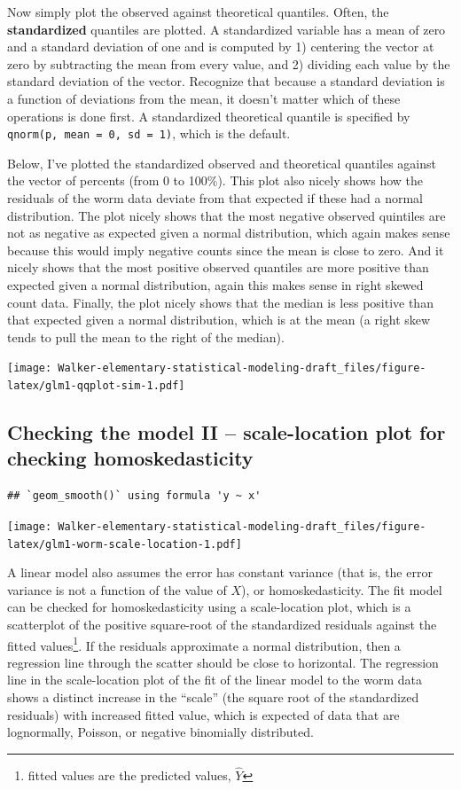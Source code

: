 \documentclass[]{book}
\let\rmarkdownfootnote\footnote%
\def\footnote{\protect\rmarkdownfootnote}
\begin{document}
Now simply plot the observed against theoretical quantiles. Often, the \textbf{standardized} quantiles are plotted. A standardized variable has a mean of zero and a standard deviation of one and is computed by 1) centering the vector at zero by subtracting the mean from every value, and 2) dividing each value by the standard deviation of the vector. Recognize that because a standard deviation is a function of deviations from the mean, it doesn't matter which of these operations is done first. A standardized theoretical quantile is specified by \texttt{qnorm(p,\ mean\ =\ 0,\ sd\ =\ 1)}, which is the default.

Below, I've plotted the standardized observed and theoretical quantiles against the vector of percents (from 0 to 100\%). This plot also nicely shows how the residuals of the worm data deviate from that expected if these had a normal distribution. The plot nicely shows that the most negative observed quintiles are not as negative as expected given a normal distribution, which again makes sense because this would imply negative counts since the mean is close to zero. And it nicely shows that the most positive observed quantiles are more positive than expected given a normal distribution, again this makes sense in right skewed count data. Finally, the plot nicely shows that the median is less positive than that expected given a normal distribution, which is at the mean (a right skew tends to pull the mean to the right of the median).

\texttt{[image: Walker-elementary-statistical-modeling-draft\_files/figure-latex/glm1-qqplot-sim-1.pdf]}

\hypertarget{checking-the-model-ii-scale-location-plot-for-checking-homoskedasticity}{%
\subsection{Checking the model II -- scale-location plot for checking homoskedasticity}\label{checking-the-model-ii-scale-location-plot-for-checking-homoskedasticity}}

\begin{verbatim}
## `geom_smooth()` using formula 'y ~ x'
\end{verbatim}

\texttt{[image: Walker-elementary-statistical-modeling-draft\_files/figure-latex/glm1-worm-scale-location-1.pdf]}

A linear model also assumes the error has constant variance (that is, the error variance is not a function of the value of \(X\)), or homoskedasticity. The fit model can be checked for homoskedasticity using a scale-location plot, which is a scatterplot of the positive square-root of the standardized residuals against the fitted values\footnote{fitted values are the predicted values, \(\hat{Y}\)}. If the residuals approximate a normal distribution, then a regression line through the scatter should be close to horizontal. The regression line in the scale-location plot of the fit of the linear model to the worm data shows a distinct increase in the ``scale'' (the square root of the standardized residuals) with increased fitted value, which is expected of data that are lognormally, Poisson, or negative binomially distributed.
\end{document}
